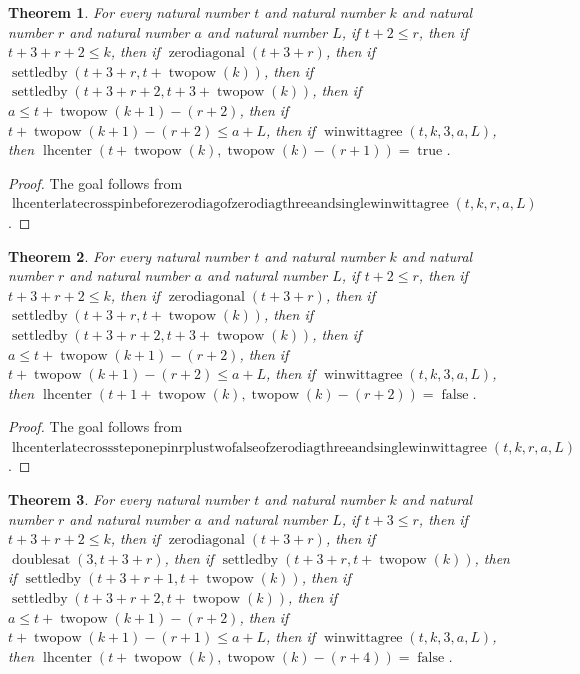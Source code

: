 \documentclass[11pt]{article}
\newtheorem{theorem}{Theorem}[section]
\theoremstyle{definition}
\begin{document}
\begin{theorem}
\label{ll:paper:lhcenter-late-cross-pin-before-zero-diag-of-zero-diag-three-and-single-winwittagree}
For every natural number \(t\) and natural number \(k\) and natural number \(r\) and natural number \(a\) and natural number \(L\), if \(t + 2 \le r\), then if \(t + 3 + r + 2 \le k\), then if \(\operatorname{zerodiagonal}(t + 3 + r)\), then if \(\operatorname{settledby}(t + 3 + r, t + \operatorname{twopow}(k))\), then if \(\operatorname{settledby}(t + 3 + r + 2, t + 3 + \operatorname{twopow}(k))\), then if \(a \le t + \operatorname{twopow}(k + 1) - (r + 2)\), then if \(t + \operatorname{twopow}(k + 1) - (r + 2) \le a + L\), then if \(\operatorname{winwittagree}(t, k, 3, a, L)\), then \(\operatorname{lhcenter}(t + \operatorname{twopow}(k), \operatorname{twopow}(k) - (r + 1)) = \operatorname{true}\).
\end{theorem}
\begin{proof}
The goal follows from \(\operatorname{lhcenterlatecrosspinbeforezerodiagofzerodiagthreeandsinglewinwittagree}(t, k, r, a, L)\).
\end{proof}
\begin{theorem}
\label{ll:paper:lhcenter-late-cross-step-one-pin-r-plus-two-false-of-zero-diag-three-and-single-winwittagree}
For every natural number \(t\) and natural number \(k\) and natural number \(r\) and natural number \(a\) and natural number \(L\), if \(t + 2 \le r\), then if \(t + 3 + r + 2 \le k\), then if \(\operatorname{zerodiagonal}(t + 3 + r)\), then if \(\operatorname{settledby}(t + 3 + r, t + \operatorname{twopow}(k))\), then if \(\operatorname{settledby}(t + 3 + r + 2, t + 3 + \operatorname{twopow}(k))\), then if \(a \le t + \operatorname{twopow}(k + 1) - (r + 2)\), then if \(t + \operatorname{twopow}(k + 1) - (r + 2) \le a + L\), then if \(\operatorname{winwittagree}(t, k, 3, a, L)\), then \(\operatorname{lhcenter}(t + 1 + \operatorname{twopow}(k), \operatorname{twopow}(k) - (r + 2)) = \operatorname{false}\).
\end{theorem}
\begin{proof}
The goal follows from \(\operatorname{lhcenterlatecrosssteponepinrplustwofalseofzerodiagthreeandsinglewinwittagree}(t, k, r, a, L)\).
\end{proof}
\begin{theorem}
\label{ll:paper:lhcenter-late-cross-pin-doubling-diag-false-of-doubles-three-and-single-winwittagree}
For every natural number \(t\) and natural number \(k\) and natural number \(r\) and natural number \(a\) and natural number \(L\), if \(t + 3 \le r\), then if \(t + 3 + r + 2 \le k\), then if \(\operatorname{zerodiagonal}(t + 3 + r)\), then if \(\operatorname{doublesat}(3, t + 3 + r)\), then if \(\operatorname{settledby}(t + 3 + r, t + \operatorname{twopow}(k))\), then if \(\operatorname{settledby}(t + 3 + r + 1, t + \operatorname{twopow}(k))\), then if \(\operatorname{settledby}(t + 3 + r + 2, t + \operatorname{twopow}(k))\), then if \(a \le t + \operatorname{twopow}(k + 1) - (r + 2)\), then if \(t + \operatorname{twopow}(k + 1) - (r + 1) \le a + L\), then if \(\operatorname{winwittagree}(t, k, 3, a, L)\), then \(\operatorname{lhcenter}(t + \operatorname{twopow}(k), \operatorname{twopow}(k) - (r + 4)) = \operatorname{false}\).
\end{theorem}
\end{document}
